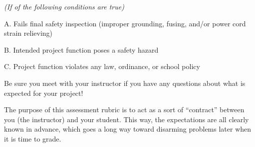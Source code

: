 \vskip 15pt

\goodbreak
\noindent
{} {\it (If  of the following conditions are true)}
\item{A.} Fails final safety inspection (improper grounding, fusing, and/or power cord strain relieving)
\item{B.} Intended project function poses a safety hazard
\item{C.} Project function violates any law, ordinance, or school policy







Be sure you meet with your instructor if you have any questions about what is expected for your project!







The purpose of this assessment rubric is to act as a sort of ``contract'' between you (the instructor) and your student.  This way, the expectations are all clearly known in advance, which goes a long way toward disarming problems later when it is time to grade.




